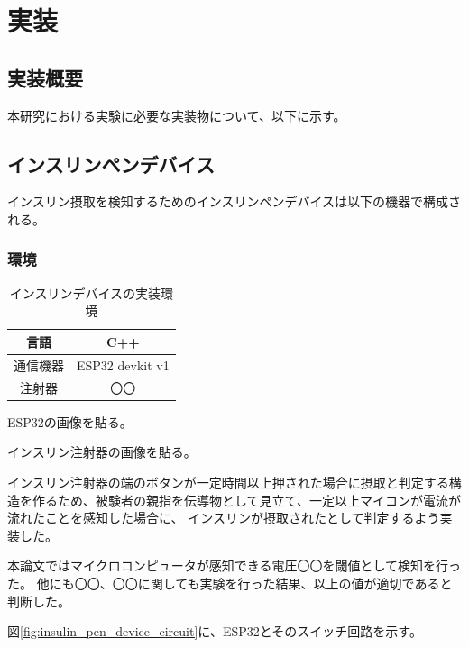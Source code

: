 \chapter{実装}
\label{chap:implementation}

\section{実装概要}
本研究における実験に必要な実装物について、以下に示す。

\section{インスリンペンデバイス}
\label{section:insulin_pen_device}

インスリン摂取を検知するためのインスリンペンデバイスは以下の機器で構成される。

\subsection{環境}

\begin{table}[htbp]
  \caption{インスリンデバイスの実装環境}
  \label{tb:insulin-device}
  \begin{center}
    \begin{tabular}{c||c}
      \hline
      言語  & C++ \\\hline
      通信機器  & ESP32 devkit v1 \\\hline
      注射器 & 〇〇 \\\hline
    \end{tabular}
  \end{center}
\end{table}

ESP32の画像を貼る。

インスリン注射器の画像を貼る。

インスリン注射器の端のボタンが一定時間以上押された場合に摂取と判定する構造を作るため、被験者の親指を伝導物として見立て、一定以上マイコンが電流が流れたことを感知した場合に、
インスリンが摂取されたとして判定するよう実装した。

本論文ではマイクロコンピュータが感知できる電圧〇〇を閾値として検知を行った。
他にも〇〇、〇〇に関しても実験を行った結果、以上の値が適切であると判断した。

図\ref{fig:insulin_pen_device_circuit}に、ESP32とそのスイッチ回路を示す。

